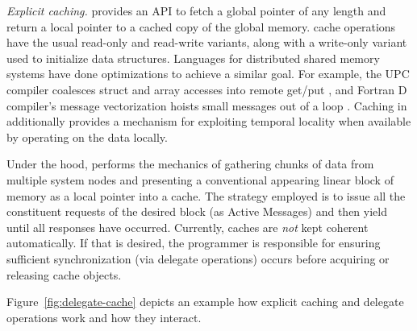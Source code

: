 \vspace{1ex}
\textit{Explicit caching.} \Grappa provides an API to fetch a global pointer of
any length and return a local pointer to a cached copy of the global memory.
\Grappa cache operations have the usual read-only and read-write variants,
along with a write-only variant used to initialize data structures. Languages
for distributed shared memory systems have done optimizations to achieve a
similar goal. For example, the UPC compiler coalesces struct and array
accesses into remote get/put \cite{Chen:2005}, and Fortran D compiler's
message vectorization hoists small messages out of a loop
\cite{FortranD:1992}. Caching in \Grappa additionally provides a mechanism for
exploiting temporal locality when available by operating on the data locally.

Under the hood, \Grappa performs the mechanics of gathering chunks of data from
multiple system nodes and presenting a conventional appearing linear block of
memory as a local pointer into a cache. The strategy employed is to issue all
the constituent requests of the desired block (as Active Messages) and then
yield until all responses have occurred. Currently, \Grappa caches are
\emph{not\/} kept coherent automatically. If that is desired, the programmer is
responsible for ensuring sufficient synchronization (via delegate operations)
occurs before acquiring or releasing cache objects.

Figure~\ref{fig:delegate-cache} depicts an example how explicit caching and
delegate operations work and how they interact.

